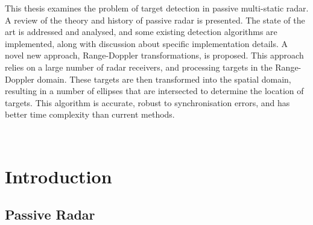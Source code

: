 \documentclass[12pt,openany,a4paper]{book}
\begin{document}

This thesis examines the problem of target detection in passive multi-static radar. A review of the theory and history of passive radar is presented. The state of the art is addressed and analysed, and some existing detection algorithms are implemented, along with discussion about specific implementation details. A novel new approach, Range-Doppler transformations, is proposed. This approach relies on a large number of radar receivers, and processing targets in the Range-Doppler domain. These targets are then transformed into the spatial domain, resulting in a number of ellipses that are intersected to determine the location of targets. This algorithm is accurate, robust to synchronisation errors, and has better time complexity than current methods.

\tableofcontents

\listoffigures
{}


% 

\newpage
\verb+ +
 
\cleardoublepage

\mainmatter


%
%
%
%	
%	

\chapter{Introduction}

\section{Passive Radar}
\end{document}
